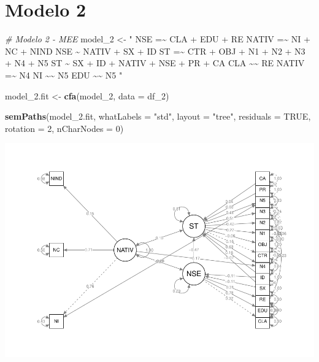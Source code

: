 \documentclass[
  12pt,
]{article}
\newenvironment{Shaded}{\begin{snugshade}}{\end{snugshade}}
\newcommand{\CommentTok}[1]{\textcolor[rgb]{0.56,0.35,0.01}{\textit{#1}}}
\newcommand{\DataTypeTok}[1]{\textcolor[rgb]{0.13,0.29,0.53}{#1}}
\newcommand{\DecValTok}[1]{\textcolor[rgb]{0.00,0.00,0.81}{#1}}
\newcommand{\FloatTok}[1]{\textcolor[rgb]{0.00,0.00,0.81}{#1}}
\newcommand{\KeywordTok}[1]{\textcolor[rgb]{0.13,0.29,0.53}{\textbf{#1}}}
\newcommand{\NormalTok}[1]{#1}
\newcommand{\OtherTok}[1]{\textcolor[rgb]{0.56,0.35,0.01}{#1}}
\newcommand{\StringTok}[1]{\textcolor[rgb]{0.31,0.60,0.02}{#1}}
\begin{document}
\hypertarget{modelo-2}{%
\section{Modelo 2}\label{modelo-2}}

\scriptsize
\singlespacing

\begin{Shaded}
\begin{Highlighting}[]
\CommentTok{\# Modelo 2 {-} MEE}
\NormalTok{model\_}\DecValTok{2}\NormalTok{ \textless{}{-}}\StringTok{ "}
\StringTok{NSE =\textasciitilde{} CLA + EDU + RE}
\StringTok{NATIV =\textasciitilde{} NI + NC + NIND}
\StringTok{NSE \textasciitilde{} NATIV + SX + ID}
\StringTok{ST =\textasciitilde{} CTR + OBJ + N1 + N2 + N3 + N4 + N5}
\StringTok{ST \textasciitilde{} SX + ID + NATIV + NSE + PR + CA}
\StringTok{CLA \textasciitilde{}\textasciitilde{} RE}
\StringTok{NATIV =\textasciitilde{} N4}
\StringTok{NI \textasciitilde{}\textasciitilde{} N5}
\StringTok{EDU \textasciitilde{}\textasciitilde{} N5}
\StringTok{"}

\NormalTok{model\_}\FloatTok{2.}\NormalTok{fit \textless{}{-}}\StringTok{ }\KeywordTok{cfa}\NormalTok{(model\_}\DecValTok{2}\NormalTok{, }\DataTypeTok{data =}\NormalTok{ df\_}\DecValTok{2}\NormalTok{)}

\KeywordTok{semPaths}\NormalTok{(model\_}\FloatTok{2.}\NormalTok{fit,}
         \DataTypeTok{whatLabels =} \StringTok{"std"}\NormalTok{,}
         \DataTypeTok{layout =} \StringTok{"tree"}\NormalTok{,}
         \DataTypeTok{residuals =} \OtherTok{TRUE}\NormalTok{,}
         \DataTypeTok{rotation =} \DecValTok{2}\NormalTok{,}
         \DataTypeTok{nCharNodes =} \DecValTok{0}\NormalTok{)}
\end{Highlighting}
\end{Shaded}

\includegraphics{trabalho_final_files/figure-latex/unnamed-chunk-5-1.pdf}
\end{document}
